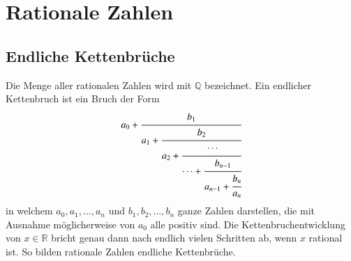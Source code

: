 
%
%
%
\section{Rationale Zahlen
\label{kettenbruch:section:Zahlen}}
\subsection{Endliche Kettenbrüche}
Die Menge aller rationalen Zahlen wird mit $\mathbb{Q}$ bezeichnet.
Ein endlicher Kettenbruch ist ein Bruch der Form
\begin{equation}
a_0 + \cfrac{b_1}{a_1+\cfrac{b_2}{a_2+\cfrac{\cdots}{\cdots+\cfrac{b_{n-1}}{a_{n-1} + \cfrac{b_n}{a_n}}}}}
\end{equation}
in welchem $a_0, a_1,\dots,a_n$ und $b_1,b_2,\dots,b_n$ ganze Zahlen
darstellen, die mit Ausnahme möglicherweise von $a_0$ alle positiv sind.
Die Kettenbruchentwicklung von $x \in \mathbb{R}$ bricht genau dann
nach endlich vielen Schritten ab, wenn $x$ rational ist. So bilden
rationale Zahlen endliche Kettenbrüche.


